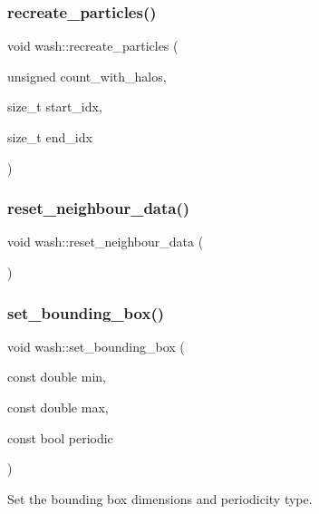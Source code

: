 \subsubsection{\texorpdfstring{recreate\+\_\+particles()}{recreate\_particles()}}
{\footnotesize\ttfamily void wash\+::recreate\+\_\+particles (\begin{DoxyParamCaption}\item[{unsigned}]{count\+\_\+with\+\_\+halos,  }\item[{size\+\_\+t}]{start\+\_\+idx,  }\item[{size\+\_\+t}]{end\+\_\+idx }\end{DoxyParamCaption})}

\mbox{\label{namespacewash_aaa0505290c83069eeb4f67744d4b8f1e}} 
\subsubsection{\texorpdfstring{reset\+\_\+neighbour\+\_\+data()}{reset\_neighbour\_data()}}
{\footnotesize\ttfamily void wash\+::reset\+\_\+neighbour\+\_\+data (\begin{DoxyParamCaption}{ }\end{DoxyParamCaption})}

\mbox{\label{namespacewash_a24bef1df5fe5c24cd518f12885a51055}} 
\subsubsection{\texorpdfstring{set\+\_\+bounding\+\_\+box()}{set\_bounding\_box()}\hspace{0.1cm}{\footnotesize\ttfamily [1/2]}}
{\footnotesize\ttfamily void wash\+::set\+\_\+bounding\+\_\+box (\begin{DoxyParamCaption}\item[{const double}]{min,  }\item[{const double}]{max,  }\item[{const bool}]{periodic }\end{DoxyParamCaption})}



Set the bounding box dimensions and periodicity type. 

